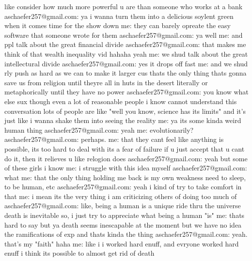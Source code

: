 like consider how much more powerful u are than someone who works at a bank
 aschaefer257@gmail.com:  ya i wanna turn them into a delicious soylent green when it comes time for the show down
 me:  they can barely opreate the easy software that someone wrote for them
 aschaefer257@gmail.com:  ya
well
 me:  and ppl talk about the great financial divide
 aschaefer257@gmail.com:  that makes me think of that wealth inequality vid
hahaha yeah
 me:  we shud talk about the great intellectural divide
 aschaefer257@gmail.com:  yes
it drops off fast
 me:  and we shud rly push as hard as we can to make it larger
cus thats the only thing thats gonna save us from religion
until theyre all in huts in the desert
literally or metaphorically
until they have no power
 aschaefer257@gmail.com:  you know what else sux though
even a lot of reasonable people i know
cannot understand this conversation
lots of people are like "well you know, science has its limits"
and it's just like i wanna shake them into seeing the reality
 me:  ya its some kinda weird human thing
 aschaefer257@gmail.com:  yeah
 me:  evolutionarily?
 aschaefer257@gmail.com:  perhaps.
 me:  that they cant feel like anything is possible, its too hard to deal with
its a fear of failure
if u just accept that u cant do it, then it relieves u
like relogion does
 aschaefer257@gmail.com:  yeah
but some of these girls i know
 me:  i struggle with this idea myself
 aschaefer257@gmail.com:  what
 me:  that the only thing holding me back is my own weakness
need to sleep, to be human, etc
 aschaefer257@gmail.com:  yeah
i kind of try to take comfort in that
 me:  i mean its the very thing i am criticizing others of doing too much of
 aschaefer257@gmail.com:  like, being a human is a unique ride thru the universe
death is inevitable
so, i just try to appreciate what being a human "is"
 me:  thats hard to say
but ya death seems inescapable at the moment
but we have no idea the ramifications of exp
and thats kinda the thing
 aschaefer257@gmail.com:  yeah. that's my "faith"
haha
 me:  like i i worked hard enuff, and evryone worked hard enuff
i think its possible to almost get rid of death

